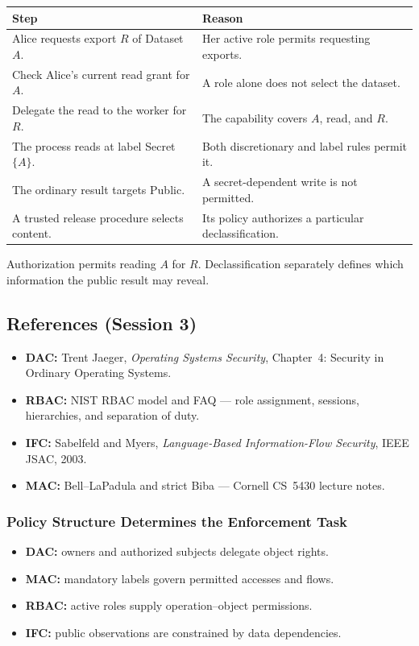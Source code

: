 \documentclass[hidelinks]{article}
\begin{document}
\begin{center}
\color{white}
\begin{tabular}{p{6.4cm}p{6.4cm}}
\hline
\textbf{Step} & \textbf{Reason}\\ \hline
Alice requests export $R$ of Dataset $A$. & Her active role permits requesting exports.\\
Check Alice's current read grant for $A$. & A role alone does not select the dataset.\\
Delegate the read to the worker for $R$. & The capability covers $A$, read, and $R$.\\
The process reads at label Secret~$\{A\}$. & Both discretionary and label rules permit it.\\
The ordinary result targets Public. & A secret-dependent write is not permitted.\\
A trusted release procedure selects content. & Its policy authorizes a particular declassification.\\ \hline
\end{tabular}
\end{center}
Authorization permits reading $A$ for $R$. Declassification separately defines which information the public result may reveal.

\subsection{References (Session 3)}

\begin{itemize}
    \item \textbf{DAC:} Trent Jaeger, \textit{Operating Systems Security}, Chapter~4: Security in Ordinary Operating Systems.
    \item \textbf{RBAC:} NIST RBAC model and FAQ --- role assignment, sessions, hierarchies, and separation of duty.
    \item \textbf{IFC:} Sabelfeld and Myers, \textit{Language-Based Information-Flow Security}, IEEE JSAC, 2003.
    \item \textbf{MAC:} Bell--LaPadula and strict Biba --- Cornell CS~5430 lecture notes.
\end{itemize}

\subsubsection{Policy Structure Determines the Enforcement Task}

\begin{itemize}
    \item \textbf{DAC:} owners and authorized subjects delegate object rights.
    \item \textbf{MAC:} mandatory labels govern permitted accesses and flows.
    \item \textbf{RBAC:} active roles supply operation--object permissions.
    \item \textbf{IFC:} public observations are constrained by data dependencies.
\end{itemize}
\end{document}
